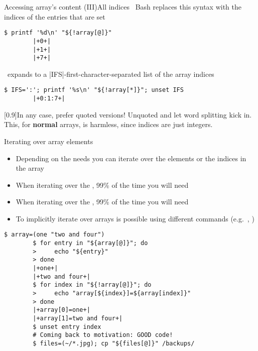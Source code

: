 \begin{frame}[fragile]{Accessing array's content (III)}{All indices}
    \vspace{-2mm}\centering
    \, Bash replaces this syntax with the indices of the entries that are set
    \smallskip
    \begin{lstlisting}[style=MyBash, numbers=none]
        $ printf '%d\n' "${!array[@]}"
        |+0+|
        |+1+|
        |+7+|
    \end{lstlisting}
    \medskip
    \, expands to a \bash|IFS|-first-character-separated list of the array indices
    \smallskip
    \begin{lstlisting}[style=MyBash, numbers=none]
        $ IFS=':'; printf '%s\n' "${!array[*]}"; unset IFS
        |+0:1:7+|
    \end{lstlisting}
    \medskip
    \begin{varblock}{}[0.9\textwidth]{In any case, prefer quoted versions!}
        Unquoted  and  let \alert{word splitting} kick in.
        This, for \textbf{normal} arrays, is harmless, since indices are just integers.
    \end{varblock}    
\end{frame}
\begin{frame}[fragile]{Iterating over array elements}
    \vspace{-3mm}
    \begin{itemize}
        \item Depending on the needs you can iterate over the elements or the indices in the array
        \item When iterating over the \textbf{}, 99\% of the time you will need \,
        \item When iterating over the \textbf{}, 99\% of the time you will need \,
        \item To implicitly iterate over arrays is possible using different commands (e.g.\ , )
    \end{itemize}
    \begin{lstlisting}[style=MyBash]
        $ array=(one "two and four")
        $ for entry in "${array[@]}"; do
        >     echo "${entry}"
        > done
        |+one+|
        |+two and four+|
        $ for index in "${!array[@]}"; do
        >     echo "array[${index}]=${array[index]}"
        > done
        |+array[0]=one+|
        |+array[1]=two and four+|
        $ unset entry index
        # Coming back to motivation: GOOD code!
        $ files=(~/*.jpg); cp "${files[@]}" /backups/
    \end{lstlisting}
\end{frame}
